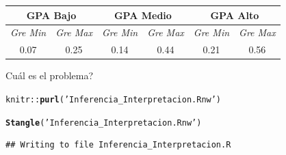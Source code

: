 \documentclass[onesided]{article}\usepackage[]{graphicx}\usepackage[]{color}
\makeatletter
\newcommand{\hlstr}[1]{\textcolor[rgb]{0.192,0.494,0.8}{#1}}%
\newcommand{\hlopt}[1]{\textcolor[rgb]{0,0,0}{#1}}%
\newcommand{\hlstd}[1]{\textcolor[rgb]{0.345,0.345,0.345}{#1}}%
\newcommand{\hlkwd}[1]{\textcolor[rgb]{0.737,0.353,0.396}{\textbf{#1}}}%
\newenvironment{kframe}{%
 \def\at@end@of@kframe{}%
 \ifinner\ifhmode%
  \def\at@end@of@kframe{\end{minipage}}%
  \begin{minipage}{\columnwidth}%
 \fi\fi%
 \def\FrameCommand##1{\hskip\@totalleftmargin \hskip-\fboxsep
 \colorbox{shadecolor}{##1}\hskip-\fboxsep
     \hskip-\linewidth \hskip-\@totalleftmargin \hskip\columnwidth}%
 \MakeFramed {\advance\hsize-\width
   \@totalleftmargin\z@ \linewidth\hsize
   \@setminipage}}%
 {\par\unskip\endMakeFramed%
 \at@end@of@kframe}
\newenvironment{knitrout}{}{} %
\makeatother
\begin{document}
\begin{table}[H]
\begin{tabular}{|c|c|c|c|c|c|}
\hline
\multicolumn{2}{|c|}{\textbf{GPA Bajo}} & \multicolumn{2}{c|}{\textbf{GPA Medio}} & \multicolumn{2}{c|}{\textbf{GPA Alto}} \\ \hline
\textit{Gre Min}   & \textit{Gre Max}   & \textit{Gre Min}   & \textit{Gre Max}   & \textit{Gre Min}   & \textit{Gre Max}  \\ \hline
0.07 & 0.25 &                    
0.14 & 0.44 &                    
0.21 & 0.56 \\ \hline
\end{tabular}
\end{table}


{\color{red}Cu\'al es el problema?}

\begin{knitrout}
\color{fgcolor}\begin{kframe}
\begin{alltt}
\hlstd{knitr}\hlopt{::}\hlkwd{purl}\hlstd{(}\hlstr{'Inferencia_Interpretacion.Rnw'}\hlstd{)}
\end{alltt}


{\ttfamily\noindent\bfseries{}}\begin{alltt}
\hlkwd{Stangle}\hlstd{(}\hlstr{'Inferencia_Interpretacion.Rnw'}\hlstd{)}
\end{alltt}
\begin{verbatim}
## Writing to file Inferencia_Interpretacion.R
\end{verbatim}
\end{kframe}
\end{knitrout}

\end{document}
